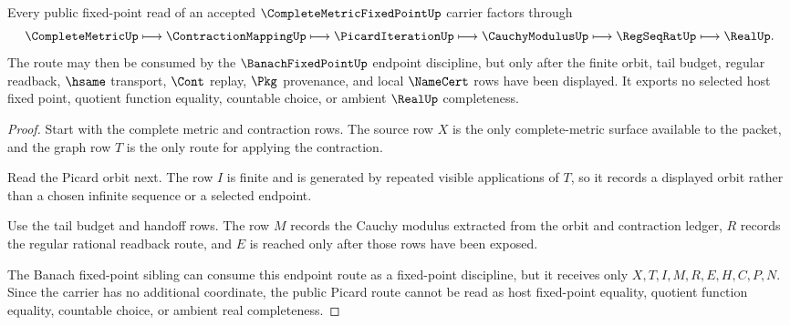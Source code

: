 \begin{theorem}
\label{thm:complete-metric-fixed-point-picard-route}
Every public fixed-point read of an accepted $\CompleteMetricFixedPointUp$ carrier factors through
$$
\CompleteMetricUp \longmapsto \ContractionMappingUp \longmapsto \PicardIterationUp \longmapsto \CauchyModulusUp \longmapsto \RegSeqRatUp \longmapsto \RealUp .
$$
The route may then be consumed by the $\BanachFixedPointUp$ endpoint discipline, but only after the finite orbit, tail budget, regular readback, $\hsame$ transport, $\Cont$ replay, $\Pkg$ provenance, and local $\NameCert$ rows have been displayed. It exports no selected host fixed point, quotient function equality, countable choice, or ambient $\RealUp$ completeness.
\end{theorem}
\begin{proof}
Start with the complete metric and contraction rows. The source row $X$ is the only complete-metric surface available to the packet, and the graph row $T$ is the only route for applying the contraction.

Read the Picard orbit next. The row $I$ is finite and is generated by repeated visible applications of $T$, so it records a displayed orbit rather than a chosen infinite sequence or a selected endpoint.

Use the tail budget and handoff rows. The row $M$ records the Cauchy modulus extracted from the orbit and contraction ledger, $R$ records the regular rational readback route, and $E$ is reached only after those rows have been exposed.

The Banach fixed-point sibling can consume this endpoint route as a fixed-point discipline, but it receives only $X,T,I,M,R,E,H,C,P,N$. Since the carrier has no additional coordinate, the public Picard route cannot be read as host fixed-point equality, quotient function equality, countable choice, or ambient real completeness.
\end{proof}



